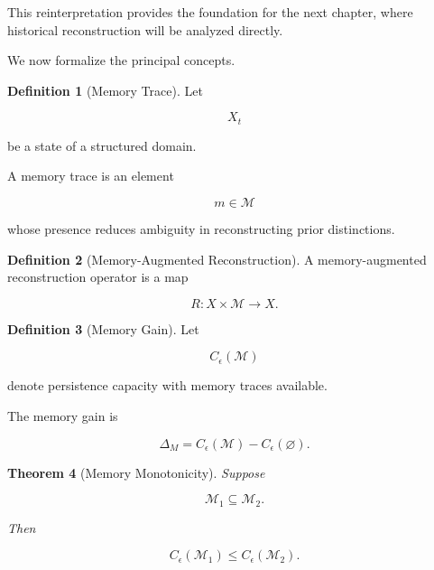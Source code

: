 \documentclass[12pt,oneside]{article}
\newtheorem{theorem}{Theorem}[section] \newtheorem{lemma}[theorem]{Lemma} \newtheorem{proposition}[theorem]{Proposition} \newtheorem{corollary}[theorem]{Corollary}
\theoremstyle{definition}
\newtheorem{definition}[theorem]{Definition} \newtheorem{axiom}[theorem]{Axiom} \newtheorem{remark}[theorem]{Remark} \newtheorem{example}[theorem]{Example}
\begin{document}
This reinterpretation provides the foundation for the next chapter, where historical reconstruction will be analyzed directly.

We now formalize the principal concepts.

\begin{definition}[Memory Trace]

Let

\[
X_t
\]

be a state of a structured domain.

A memory trace is an element

\[
m\in\mathcal M
\]

whose presence reduces ambiguity in reconstructing prior distinctions.

\end{definition}

\begin{definition}[Memory-Augmented Reconstruction]

A memory-augmented reconstruction operator is a map

\[
R:
X\times\mathcal M
\rightarrow
X.
\]

\end{definition}

\begin{definition}[Memory Gain]

Let

\[
C_\epsilon(\mathcal M)
\]

denote persistence capacity with memory traces available.

The memory gain is

\[
\Delta_M
=
C_\epsilon(\mathcal M)
-
C_\epsilon(\varnothing).
\]

\end{definition}

\begin{theorem}[Memory Monotonicity]

Suppose

\[
\mathcal M_1
\subseteq
\mathcal M_2.
\]

Then

\[
C_\epsilon(\mathcal M_1)
\le
C_\epsilon(\mathcal M_2).
\]

\end{theorem}
\end{document}
